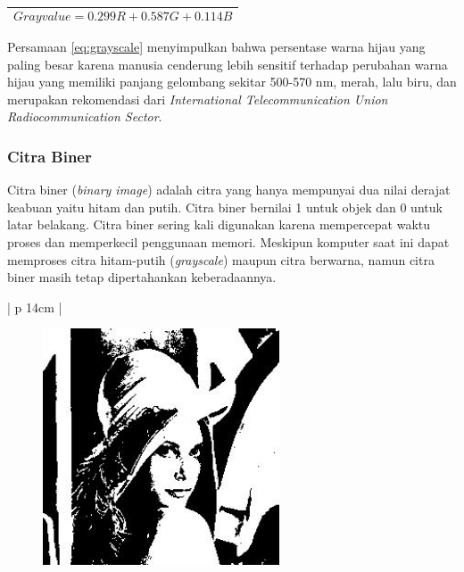 \begin{table}[H]
	\begin{adjustbox}{width=1\textwidth}
		\begin{tabular}{|p{13.55cm}|}
			\hline
			\begin{equation}
			Gray value = 0.299 R + 0.587 G + 0.114 B
			\label{eq:grayscale}
			\end{equation}\\
			\hline
		\end{tabular}
	\end{adjustbox}
\end{table}

Persamaan \ref{eq:grayscale} menyimpulkan bahwa persentase warna hijau yang paling besar karena manusia cenderung lebih sensitif terhadap perubahan warna hijau yang memiliki panjang gelombang sekitar 500-570 nm, merah, lalu biru, dan merupakan rekomendasi dari \textit{International Telecommunication Union Radiocommunication Sector}.\\

\subsubsection{Citra Biner}
Citra biner (\textit{binary image}) adalah citra yang hanya mempunyai dua nilai derajat keabuan yaitu hitam dan putih. Citra biner bernilai 1 untuk objek dan 0 untuk latar belakang. Citra biner sering kali digunakan karena mempercepat waktu proses dan memperkecil penggunaan memori\cite{munir}. Meskipun komputer saat ini dapat memproses citra hitam-putih (\textit{grayscale}) maupun citra berwarna, namun citra biner masih tetap dipertahankan keberadaannya. 

\begin{table}[H]
	\small
	\begin{adjustbox}{width=1\textwidth}
		\begin{tabular}{| p {14cm} |}
			\hline
			\begin{figure}[H]
				\centering
				\includegraphics[width=7cm]{images/biner.jpg}
			\end{figure} \\
			\hline
		\end{tabular}
	\end{adjustbox}
	\label{img:binary}
\end{table}

